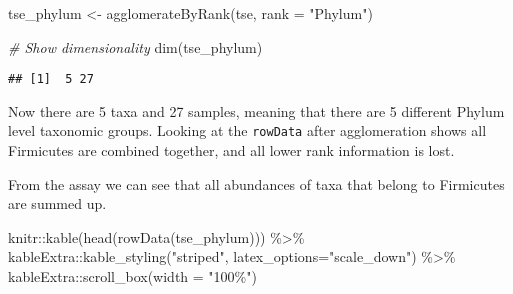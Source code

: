 \documentclass[
  oneside]{book}
\newenvironment{Shaded}{\begin{snugshade}}{\end{snugshade}}
\newcommand{\AttributeTok}[1]{\textcolor[rgb]{0.77,0.63,0.00}{#1}}
\newcommand{\CommentTok}[1]{\textcolor[rgb]{0.56,0.35,0.01}{\textit{#1}}}
\newcommand{\FunctionTok}[1]{\textcolor[rgb]{0.00,0.00,0.00}{#1}}
\newcommand{\NormalTok}[1]{#1}
\newcommand{\OtherTok}[1]{\textcolor[rgb]{0.56,0.35,0.01}{#1}}
\newcommand{\SpecialCharTok}[1]{\textcolor[rgb]{0.00,0.00,0.00}{#1}}
\newcommand{\StringTok}[1]{\textcolor[rgb]{0.31,0.60,0.02}{#1}}
\begin{document}
\begin{Shaded}
\begin{Highlighting}[]
\NormalTok{tse\_phylum }\OtherTok{\textless{}{-}} \FunctionTok{agglomerateByRank}\NormalTok{(tse, }\AttributeTok{rank =} \StringTok{"Phylum"}\NormalTok{)}

\CommentTok{\# Show dimensionality}
\FunctionTok{dim}\NormalTok{(tse\_phylum)}
\end{Highlighting}
\end{Shaded}

\begin{verbatim}
## [1]  5 27
\end{verbatim}

Now there are 5 taxa and 27
samples, meaning that there are 5 different
Phylum level taxonomic groups. Looking at the \texttt{rowData} after
agglomeration shows all Firmicutes are combined together, and all
lower rank information is lost.

From the assay we can see that all abundances of taxa that belong to
Firmicutes are summed up.

\begin{Shaded}
\begin{Highlighting}[]
\NormalTok{knitr}\SpecialCharTok{::}\FunctionTok{kable}\NormalTok{(}\FunctionTok{head}\NormalTok{(}\FunctionTok{rowData}\NormalTok{(tse\_phylum))) }\SpecialCharTok{\%\textgreater{}\%} 
\NormalTok{  kableExtra}\SpecialCharTok{::}\FunctionTok{kable\_styling}\NormalTok{(}\StringTok{"striped"}\NormalTok{, }
                            \AttributeTok{latex\_options=}\StringTok{"scale\_down"}\NormalTok{) }\SpecialCharTok{\%\textgreater{}\%} 
\NormalTok{  kableExtra}\SpecialCharTok{::}\FunctionTok{scroll\_box}\NormalTok{(}\AttributeTok{width =} \StringTok{"100\%"}\NormalTok{)}
\end{Highlighting}
\end{Shaded}

\begin{table}
\centering
{}
\end{table}
\end{document}
